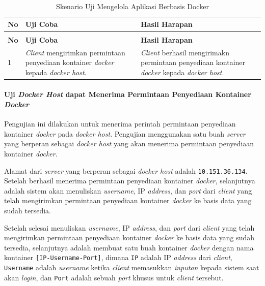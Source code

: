 \begin{longtable}{|p{}|p{}|p{}|}					\caption{Skenario Uji \textit{Client} dapat \textit{Login} Mengirimkan Permintaan Penyediaan Kontainer \textit{Docker}} \label{ujicoba2} \\
	\hline
	\textbf{No} & \textbf{Uji Coba} & \textbf{Hasil Harapan} \\ \hline
	\endfirsthead
	\caption[]{Skenario Uji Mengelola Aplikasi Berbasis Docker} \\
	\hline
	\textbf{No} & \textbf{Uji Coba} & \textbf{Hasil Harapan} \\ \hline
	\endhead
	\endfoot
	\endlastfoot
	
	1 & \textit{Client} mengirimkan permintaan penyediaan kontainer \textit{docker} kepada \textit{docker host}. & \textit{Client} berhasil mengirimakn permintaan penyediaan kontainer \textit{docker} kepada \textit{docker host}.\\ \hline
\end{longtable}

\paragraph{Uji \textit{Docker Host} dapat Menerima Permintaan Penyediaan Kontainer \textit{Docker}} \label{ketiga}
Pengujian ini dilakukan untuk menerima perintah permintaan penyediaan kontainer \textit{docker} pada \textit{docker host}. Pengujian menggunakan satu buah \textit{server} yang berperan sebagai \textit{docker host} yang akan menerima permintaan penyediaan kontainer \textit{docker}.

Alamat dari \textit{server} yang berperan sebagai \textit{docker host} adalah \texttt{10.151.36.134}. Setelah berhasil menerima permintaan penyediaan kontainer \textit{docker}, selanjutnya adalah sistem akan menuliskan \textit{username}, IP \textit{address}, dan \textit{port} dari \textit{client} yang telah mengirimkan permintaan penyediaan kontainer \textit{docker} ke basis data yang sudah tersedia.

Setelah selesai menuliskan \textit{username}, IP \textit{address}, dan \textit{port} dari \textit{client} yang telah mengirimkan permintaan penyediaan kontainer \textit{docker} ke basis data yang sudah tersedia, selanjutnya adalah membuat satu buah kontainer \textit{docker} dengan nama kontainer \texttt{[IP-Username-Port]}, dimana \texttt{IP} adalah IP \textit{address} dari \textit{client}, \texttt{Username} adalah \textit{username} ketika \textit{client} memasukkan \textit{inputan} kepada sistem saat akan \textit{login}, dan \texttt{Port} adalah sebuah \textit{port} khusus untuk \textit{client} tersebut.

